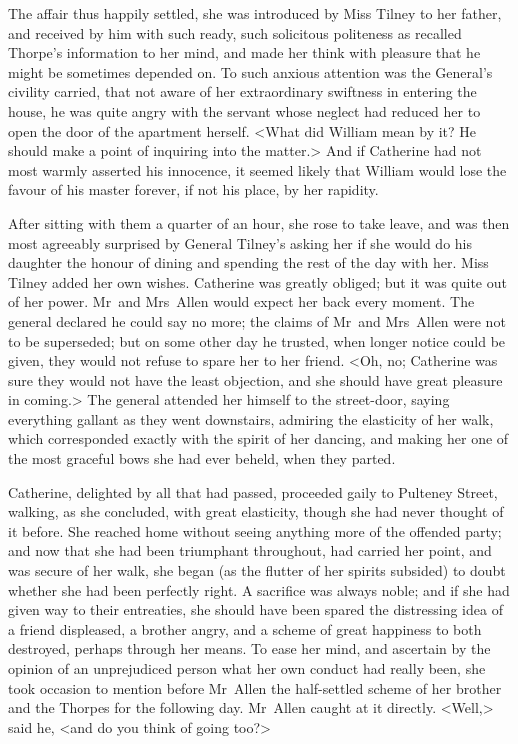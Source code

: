  The affair thus happily settled, she was introduced by Miss Tilney to her father, and received by him with such ready, such solicitous politeness as recalled Thorpe's information to her mind, and made her think with pleasure that he might be sometimes depended on. To such anxious attention was the General's civility carried, that not aware of her extraordinary swiftness in entering the house, he was quite angry with the servant whose neglect had reduced her to open the door of the apartment herself. <What did William mean by it? He should make a point of inquiring into the matter.> And if Catherine had not most warmly asserted his innocence, it seemed likely that William would lose the favour of his master forever, if not his place, by her rapidity. 

 After sitting with them a quarter of an hour, she rose to take leave, and was then most agreeably surprised by General Tilney's asking her if she would do his daughter the honour of dining and spending the rest of the day with her. Miss Tilney added her own wishes. Catherine was greatly obliged; but it was quite out of her power. Mr~and Mrs~Allen would expect her back every moment. The general declared he could say no more; the claims of Mr~and Mrs~Allen were not to be superseded; but on some other day he trusted, when longer notice could be given, they would not refuse to spare her to her friend. <Oh, no; Catherine was sure they would not have the least objection, and she should have great pleasure in coming.> The general attended her himself to the street-door, saying everything gallant as they went downstairs, admiring the elasticity of her walk, which corresponded exactly with the spirit of her dancing, and making her one of the most graceful bows she had ever beheld, when they parted. 

 Catherine, delighted by all that had passed, proceeded gaily to Pulteney Street, walking, as she concluded, with great elasticity, though she had never thought of it before. She reached home without seeing anything more of the offended party; and now that she had been triumphant throughout, had carried her point, and was secure of her walk, she began (as the flutter of her spirits subsided) to doubt whether she had been perfectly right. A sacrifice was always noble; and if she had given way to their entreaties, she should have been spared the distressing idea of a friend displeased, a brother angry, and a scheme of great happiness to both destroyed, perhaps through her means. To ease her mind, and ascertain by the opinion of an unprejudiced person what her own conduct had really been, she took occasion to mention before Mr~Allen the half-settled scheme of her brother and the Thorpes for the following day. Mr~Allen caught at it directly. <Well,> said he, <and do you think of going too?> 

